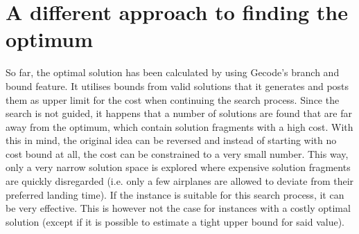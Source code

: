\documentclass[,%
			paper=a4,%
			DIV11,
			liststotoc,
			bibtotoc,
			draft=false,%
			numbers=noendperiod
			]{scrartcl}
\begin{document}
\section{A different approach to finding the optimum}
So far, the optimal solution has been calculated by using Gecode's branch and bound feature.
It utilises bounds from valid solutions that it generates and posts them as upper limit for the cost when continuing the search process.
Since the search is not guided, it happens that a number of solutions are found that are far away from the optimum, which contain solution fragments with a high cost. 
With this in mind, the original idea can be reversed and instead of starting with no cost bound at all, the cost can be constrained to a very small number.
This way, only a very narrow solution space is explored where expensive solution fragments are quickly disregarded (i.e. only a few airplanes are allowed to deviate from their preferred landing time).
If the instance is suitable for this search process, it can be very effective.
This is however not the case for instances with a costly optimal solution (except if it is possible to estimate a tight upper bound for said value).
\end{document}
